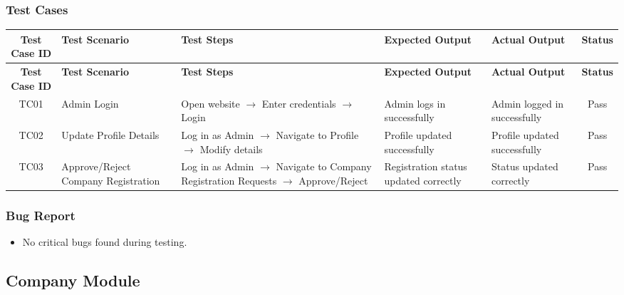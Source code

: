 \documentclass{article}
\begin{document}
\subsubsection{Test Cases}
\small
\setlength\LTleft{0pt}
\setlength\LTright{0pt}
\begin{longtable}{|c|p{2.8cm}|p{4cm}|p{2.8cm}|p{2.8cm}|c|}
\hline
\textbf{Test Case ID} & \textbf{Test Scenario} & \textbf{Test Steps} & \textbf{Expected Output} & \textbf{Actual Output} & \textbf{Status} \\
\hline
\endfirsthead
\hline
\textbf{Test Case ID} & \textbf{Test Scenario} & \textbf{Test Steps} & \textbf{Expected Output} & \textbf{Actual Output} & \textbf{Status} \\
\hline
\endhead
TC01 & Admin Login & Open website $\rightarrow$ Enter credentials $\rightarrow$ Login & Admin logs in successfully & Admin logged in successfully & Pass \\
\hline
TC02 & Update Profile Details & Log in as Admin $\rightarrow$ Navigate to Profile $\rightarrow$ Modify details & Profile updated successfully & Profile updated successfully & Pass \\
\hline
TC03 & Approve/Reject Company Registration & Log in as Admin $\rightarrow$ Navigate to Company Registration Requests $\rightarrow$ Approve/Reject & Registration status updated correctly & Status updated correctly & Pass \\
\hline
\end{longtable}

\subsubsection{Bug Report}
\begin{itemize}
    \item No critical bugs found during testing.
\end{itemize}

\newpage

\subsection{Company Module}
\end{document}

